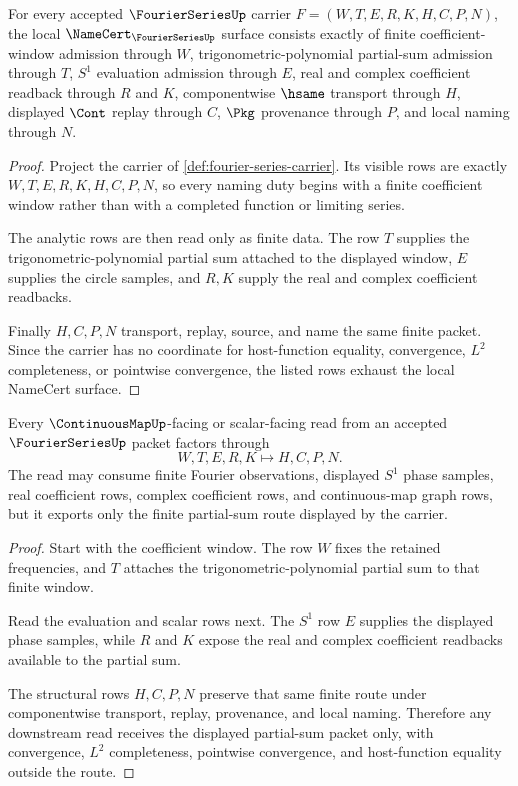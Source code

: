 \begin{theorem}
\label{thm:fourier-series-namecert-obligations}
For every accepted $\FourierSeriesUp$ carrier $F=(W,T,E,R,K,H,C,P,N)$, the local $\NameCert_{\FourierSeriesUp}$ surface consists exactly of finite coefficient-window admission through $W$, trigonometric-polynomial partial-sum admission through $T$, $S^{1}$ evaluation admission through $E$, real and complex coefficient readback through $R$ and $K$, componentwise $\hsame$ transport through $H$, displayed $\Cont$ replay through $C$, $\Pkg$ provenance through $P$, and local naming through $N$.
\end{theorem}
\begin{proof}
Project the carrier of \autoref{def:fourier-series-carrier}. Its visible rows are exactly $W,T,E,R,K,H,C,P,N$, so every naming duty begins with a finite coefficient window rather than with a completed function or limiting series.

The analytic rows are then read only as finite data. The row $T$ supplies the trigonometric-polynomial partial sum attached to the displayed window, $E$ supplies the circle samples, and $R,K$ supply the real and complex coefficient readbacks.

Finally $H,C,P,N$ transport, replay, source, and name the same finite packet. Since the carrier has no coordinate for host-function equality, convergence, $L^{2}$ completeness, or pointwise convergence, the listed rows exhaust the local NameCert surface.
\end{proof}

\begin{theorem}
\label{thm:fourier-series-finite-partial-sum-route}
Every $\ContinuousMapUp$-facing or scalar-facing read from an accepted $\FourierSeriesUp$ packet factors through
$$
W,T,E,R,K \longmapsto H,C,P,N .
$$
The read may consume finite Fourier observations, displayed $S^{1}$ phase samples, real coefficient rows, complex coefficient rows, and continuous-map graph rows, but it exports only the finite partial-sum route displayed by the carrier.
\end{theorem}
\begin{proof}
Start with the coefficient window. The row $W$ fixes the retained frequencies, and $T$ attaches the trigonometric-polynomial partial sum to that finite window.

Read the evaluation and scalar rows next. The $S^{1}$ row $E$ supplies the displayed phase samples, while $R$ and $K$ expose the real and complex coefficient readbacks available to the partial sum.

The structural rows $H,C,P,N$ preserve that same finite route under componentwise transport, replay, provenance, and local naming. Therefore any downstream read receives the displayed partial-sum packet only, with convergence, $L^{2}$ completeness, pointwise convergence, and host-function equality outside the route.
\end{proof}

